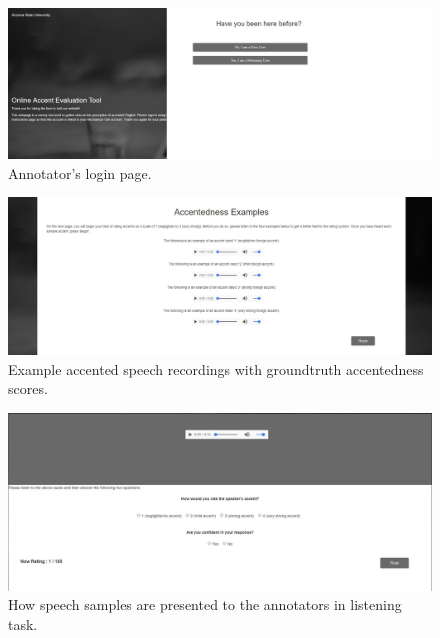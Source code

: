 \begin{figure}[t]
\centering
\captionsetup{justification=centering}
\includegraphics[width = 0.8\linewidth]{figures/webpage1.JPG}
\caption{Annotator's login page.}
\label{fig:amt_login}
\end{figure}

\begin{figure}[t]
\centering
\captionsetup{justification=centering}
\includegraphics[width = 0.8\linewidth]{figures/webpage2.JPG}
\caption{Example accented speech recordings with groundtruth accentedness scores.}
\label{fig:amt_example}
\end{figure}

\begin{figure}[t]
\centering
\captionsetup{justification=centering}
\includegraphics[width = 0.8\linewidth]{figures/webpage3.JPG}
\caption{How speech samples are presented to the annotators in listening task.}
\label{fig:amt_listen}
\end{figure}

